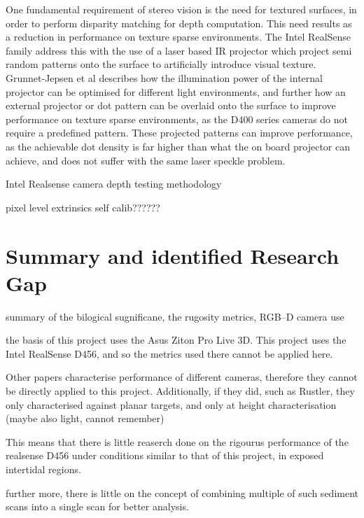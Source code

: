 One fundamental requirement of stereo vision is the need for textured surfaces, in order to perform disparity matching for depth computation. This need results as a reduction in performance on texture sparse environments. The Intel RealSense family address this with the use of a laser based IR projector which project semi random patterns onto the surface to artificially introduce visual texture. Grunnet-Jepsen et al \cite{ProjectorsD400Series} describes how the illumination power of the internal projector can be optimised for different light environments, and further how an external projector or dot pattern can be overlaid onto the surface to improve performance on texture sparse environments, as the D400 series cameras do not require a predefined pattern. These projected patterns can improve performance, as the achievable dot density is far higher than what the on board projector can achieve, and does not suffer with the same laser speckle problem. 


Intel Realsense camera depth testing methodology
 
pixel level extrinsics self calib??????


 \section{Summary and identified Research Gap}

summary of the bilogical sugnificane, the rugosity metrics, RGB--D camera use


the basis of this project uses the Asus  Ziton Pro Live 3D. This project uses the Intel RealSense D456, and so the metrics used there cannot be applied here.

Other papers characterise performance of different cameras, therefore they cannot be directly applied to this project. Additionally, if they did, such as Rustler, they only characterised against planar targets, and only at height characterisation (maybe also light, cannot remember)

This means that there is little reaserch done on the rigourus performance of the realsense D456 under conditions similar to that of this project, in exposed intertidal regions.

further more, there is little on the concept of combining multiple of such sediment scans into a single scan for better analysis.


